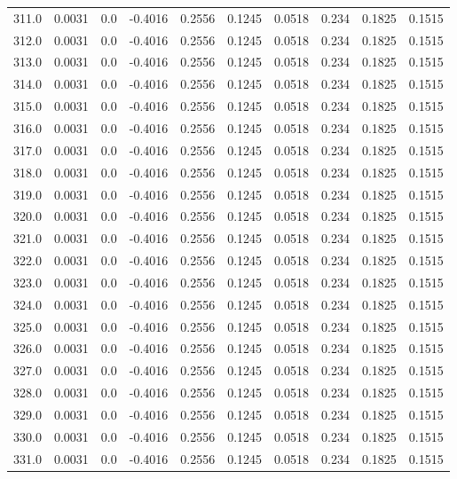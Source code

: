 \begin{longtable}{lrrrrrrrrr}
311.0 & 0.0031 & 0.0 & -0.4016 & 0.2556 & 0.1245 & 0.0518 & 0.234 & 0.1825 & 0.1515 \\
312.0 & 0.0031 & 0.0 & -0.4016 & 0.2556 & 0.1245 & 0.0518 & 0.234 & 0.1825 & 0.1515 \\
313.0 & 0.0031 & 0.0 & -0.4016 & 0.2556 & 0.1245 & 0.0518 & 0.234 & 0.1825 & 0.1515 \\
314.0 & 0.0031 & 0.0 & -0.4016 & 0.2556 & 0.1245 & 0.0518 & 0.234 & 0.1825 & 0.1515 \\
315.0 & 0.0031 & 0.0 & -0.4016 & 0.2556 & 0.1245 & 0.0518 & 0.234 & 0.1825 & 0.1515 \\
316.0 & 0.0031 & 0.0 & -0.4016 & 0.2556 & 0.1245 & 0.0518 & 0.234 & 0.1825 & 0.1515 \\
317.0 & 0.0031 & 0.0 & -0.4016 & 0.2556 & 0.1245 & 0.0518 & 0.234 & 0.1825 & 0.1515 \\
318.0 & 0.0031 & 0.0 & -0.4016 & 0.2556 & 0.1245 & 0.0518 & 0.234 & 0.1825 & 0.1515 \\
319.0 & 0.0031 & 0.0 & -0.4016 & 0.2556 & 0.1245 & 0.0518 & 0.234 & 0.1825 & 0.1515 \\
320.0 & 0.0031 & 0.0 & -0.4016 & 0.2556 & 0.1245 & 0.0518 & 0.234 & 0.1825 & 0.1515 \\
321.0 & 0.0031 & 0.0 & -0.4016 & 0.2556 & 0.1245 & 0.0518 & 0.234 & 0.1825 & 0.1515 \\
322.0 & 0.0031 & 0.0 & -0.4016 & 0.2556 & 0.1245 & 0.0518 & 0.234 & 0.1825 & 0.1515 \\
323.0 & 0.0031 & 0.0 & -0.4016 & 0.2556 & 0.1245 & 0.0518 & 0.234 & 0.1825 & 0.1515 \\
324.0 & 0.0031 & 0.0 & -0.4016 & 0.2556 & 0.1245 & 0.0518 & 0.234 & 0.1825 & 0.1515 \\
325.0 & 0.0031 & 0.0 & -0.4016 & 0.2556 & 0.1245 & 0.0518 & 0.234 & 0.1825 & 0.1515 \\
326.0 & 0.0031 & 0.0 & -0.4016 & 0.2556 & 0.1245 & 0.0518 & 0.234 & 0.1825 & 0.1515 \\
327.0 & 0.0031 & 0.0 & -0.4016 & 0.2556 & 0.1245 & 0.0518 & 0.234 & 0.1825 & 0.1515 \\
328.0 & 0.0031 & 0.0 & -0.4016 & 0.2556 & 0.1245 & 0.0518 & 0.234 & 0.1825 & 0.1515 \\
329.0 & 0.0031 & 0.0 & -0.4016 & 0.2556 & 0.1245 & 0.0518 & 0.234 & 0.1825 & 0.1515 \\
330.0 & 0.0031 & 0.0 & -0.4016 & 0.2556 & 0.1245 & 0.0518 & 0.234 & 0.1825 & 0.1515 \\
331.0 & 0.0031 & 0.0 & -0.4016 & 0.2556 & 0.1245 & 0.0518 & 0.234 & 0.1825 & 0.1515 \\

\end{longtable}
